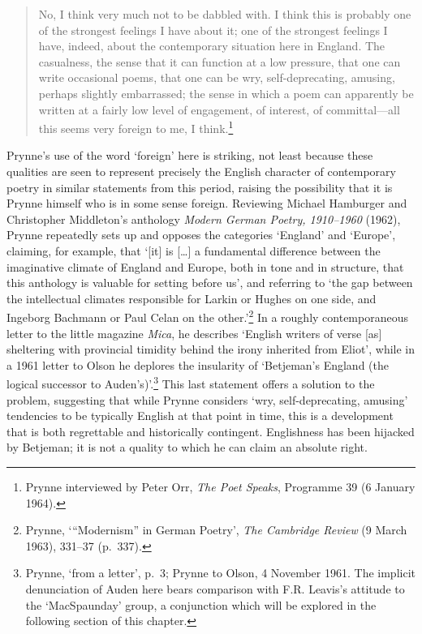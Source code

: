 \documentclass[]{article}
\begin{document}
\begin{quote}
\singlespacing No, I think very much not to be dabbled with. I think
this is probably one of the strongest feelings I have about it; one of
the strongest feelings I have, indeed, about the contemporary situation
here in England. The casualness, the sense that it can function at a low
pressure, that one can write occasional poems, that one can be wry,
self-deprecating, amusing, perhaps slightly embarrassed; the sense in
which a poem can apparently be written at a fairly low level of
engagement, of interest, of committal—all this seems very foreign to me,
I think.\footnote{Prynne interviewed by Peter Orr, \emph{The Poet
  Speaks}, Programme 39 (6 January 1964).}
\end{quote}

\noindent Prynne’s use of the word ‘foreign’ here is striking, not least
because these qualities are seen to represent precisely the English
character of contemporary poetry in similar statements from this period,
raising the possibility that it is Prynne himself who is in some sense
foreign. Reviewing Michael Hamburger and Christopher Middleton’s
anthology \emph{Modern German Poetry, 1910–1960} (1962), Prynne
repeatedly sets up and opposes the categories ‘England’ and ‘Europe’,
claiming, for example, that ‘{[}it{]} is {[}\ldots{}{]} a fundamental
difference between the imaginative climate of England and Europe, both
in tone and in structure, that this anthology is valuable for setting
before us’, and referring to ‘the gap between the intellectual climates
responsible for Larkin or Hughes on one side, and Ingeborg Bachmann or
Paul Celan on the other.’\footnote{Prynne, ‘“Modernism” in German
  Poetry’, \emph{The Cambridge Review} (9 March 1963), 331–37 (p.~337).}
In a roughly contemporaneous letter to the little magazine \emph{Mica},
he describes ‘English writers of verse {[}as{]} sheltering with
provincial timidity behind the irony inherited from Eliot’, while in a
1961 letter to Olson he deplores the insularity of ‘Betjeman’s England
(the logical successor to Auden’s)’.\footnote{Prynne, ‘from a letter’,
  p.~3; Prynne to Olson, 4 November 1961. The implicit denunciation of
  Auden here bears comparison with F.R. Leavis’s attitude to the
  ‘MacSpaunday’ group, a conjunction which will be explored in the
  following section of this chapter.} This last statement offers a
solution to the problem, suggesting that while Prynne considers ‘wry,
self-deprecating, amusing’ tendencies to be typically English at that
point in time, this is a development that is both regrettable and
historically contingent. Englishness has been hijacked by Betjeman; it
is not a quality to which he can claim an absolute right.
\end{document}
